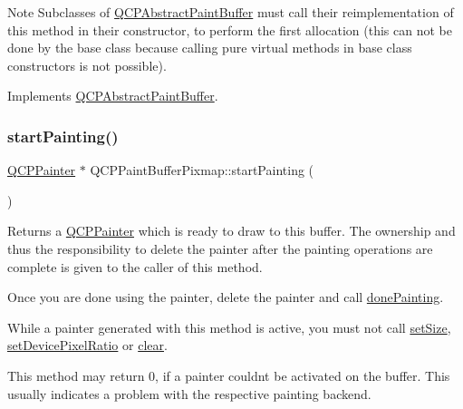 \begin{DoxyNote}{Note}
Subclasses of \hyperlink{class_q_c_p_abstract_paint_buffer}{Q\+C\+P\+Abstract\+Paint\+Buffer} must call their reimplementation of this method in their constructor, to perform the first allocation (this can not be done by the base class because calling pure virtual methods in base class constructors is not possible). 
\end{DoxyNote}


Implements \hyperlink{class_q_c_p_abstract_paint_buffer_aee7506a52bd7e5a07c2af27935eb13e7}{Q\+C\+P\+Abstract\+Paint\+Buffer}.

\mbox{\label{class_q_c_p_paint_buffer_pixmap_a357964ef7d28cfa530338be4e5c93234}} 
\subsubsection{\texorpdfstring{start\+Painting()}{startPainting()}}
{\footnotesize\ttfamily \hyperlink{class_q_c_p_painter}{Q\+C\+P\+Painter} $\ast$ Q\+C\+P\+Paint\+Buffer\+Pixmap\+::start\+Painting (\begin{DoxyParamCaption}{ }\end{DoxyParamCaption})\hspace{0.3cm}{\ttfamily [virtual]}}

Returns a \hyperlink{class_q_c_p_painter}{Q\+C\+P\+Painter} which is ready to draw to this buffer. The ownership and thus the responsibility to delete the painter after the painting operations are complete is given to the caller of this method.

Once you are done using the painter, delete the painter and call \hyperlink{class_q_c_p_abstract_paint_buffer_a41b0dc6e7744f19fae09f8532c207dc1}{done\+Painting}.

While a painter generated with this method is active, you must not call \hyperlink{class_q_c_p_abstract_paint_buffer_a8b68c3cd36533f1a4a23b5ce8cd66f01}{set\+Size}, \hyperlink{class_q_c_p_abstract_paint_buffer_a555eaad5d5c806420ff35602a1bb68fa}{set\+Device\+Pixel\+Ratio} or \hyperlink{class_q_c_p_paint_buffer_pixmap_a14badbd010a3cde6b55817ccb7b65217}{clear}.

This method may return 0, if a painter couldn\textquotesingle{}t be activated on the buffer. This usually indicates a problem with the respective painting backend. 

